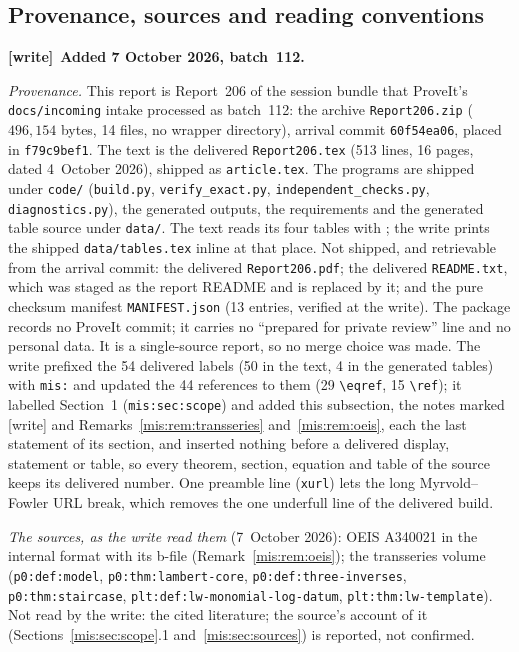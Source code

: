 \documentclass[11pt]{article}
\theoremstyle{remark}\newtheorem{remark}[theorem]{Remark}
\newcommand{\file}[1]{\nolinkurl{#1}}
\newenvironment{writenote}[1][]{\par\smallskip\begingroup\small
 \noindent\textbf{[write]}\if\relax\detokenize{#1}\relax\else~\textbf{#1.}\fi\ }%
 {\par\endgroup\smallskip}
\begin{document}
\subsection{Provenance, sources and reading conventions}\label{mis:sec:provenance}
\begin{writenote}[Added 7 October 2026, batch~112]\raggedright
\emph{Provenance.} This report is Report~206 of the session bundle that
ProveIt's \file{docs/incoming} intake processed as batch~112: the archive
\file{Report206.zip} ($496{,}154$ bytes, 14 files, no wrapper directory),
arrival commit \file{60f54ea06}, placed in \file{f79c9bef1}. The text is the
delivered \file{Report206.tex} (513 lines, 16 pages, dated 4~October 2026),
shipped as \file{article.tex}. The programs are shipped under \file{code/}
(\file{build.py}, \file{verify_exact.py}, \file{independent_checks.py},
\file{diagnostics.py}), the generated outputs, the requirements and the
generated table source under \file{data/}. The text reads its four tables with
\verb||; the write prints the shipped \file{data/tables.tex}
inline at that place. Not shipped, and retrievable from the arrival commit:
the delivered \file{Report206.pdf}; the delivered \file{README.txt}, which was
staged as the report README and is replaced by it; and the pure checksum
manifest \file{MANIFEST.json} (13 entries, verified at the write). The package
records no ProveIt commit; it carries no ``prepared for private review'' line
and no personal data. It is a single-source report, so no merge choice was
made. The write prefixed the 54 delivered labels (50 in the text, 4 in the
generated tables) with \file{mis:} and updated the 44 references to them (29
\verb|\eqref|, 15 \verb|\ref|); it labelled Section~1
(\file{mis:sec:scope}) and added this subsection, the notes marked
[write] and Remarks~\ref{mis:rem:transseries} and~\ref{mis:rem:oeis}, each the
last statement of its section, and inserted nothing before a delivered display,
statement or table, so every theorem, section, equation and table of the source
keeps its delivered number. One preamble line (\texttt{xurl}) lets the long
Myrvold--Fowler URL break, which removes the one underfull line of the
delivered build.

\emph{The sources, as the write read them} (7~October 2026): OEIS A340021 in
the internal format with its b-file (Remark~\ref{mis:rem:oeis}); the
transseries volume
(\file{p0:def:model}, \file{p0:thm:lambert-core}, \file{p0:def:three-inverses},
\file{p0:thm:staircase}, \file{plt:def:lw-monomial-log-datum},
\file{plt:thm:lw-template}). Not read by the write: the cited literature; the
source's account of it (Sections~\ref{mis:sec:scope}.1 and~\ref{mis:sec:sources})
is reported, not confirmed.


\end{writenote}
\end{document}
